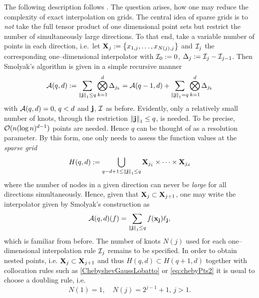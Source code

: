\documentclass[12pt, oneside]{amsart}
\theoremstyle{definition}
\theoremstyle{remark}
\numberwithin{equation}{section}
\begin{document}
The following description follows \cite{BarthelmannHighDim_2000}.
The question arises, how one may reduce the complexity of exact interpolation 
on grids. The central idea of sparse grids is to \emph{not} take the full 
tensor product of one dimensional point sets but restrict the number of 
simultaneously large directions. To that end, take a variable 
number of points in each direction, i.e.\ let \(\XX_j \defn \set{x_{1, j}, 
	\dots, x_{N(j), j}}\) and \(\cI_j\) the corresponding one--dimensional 
interpolator with \(\cI_0 \defn 0\), \(\Delta_j \defn \cI_j - \cI_{j-1}\). 
 Then Smolyak's algorithm is given in a simple recursive 
manner
\begin{equation}\label{Smolyak}
	\cA(q, d) \defn \sum_{\norm[1]{\bfj} \leq q} \bigotimes_{k=1}^d 
	\Delta_{j_k} = \cA(q-1, d)+\sum_{\norm[1]{\bfj}=q} \bigotimes_{k=1}^d 
	\Delta_{j_k}
\end{equation}
with \(\cA(q, d) = 0,\, q < d\) and \(\bfj\), \(\cI\) as before. Evidently, 
only a relatively small number of knots, through the restriction 
\(\norm[1]{\bfj} \leq q\), is needed. To be precise, \(\cO(n (\log n)^{d-1})\) 
points are needed. Hence \(q\)  can be thought of 
as a resolution parameter. By 
this form, one only needs to assess the function values at the \emph{sparse 
grid} \[
H(q, d) \defn \bigcup_{q-d+1 \leq \norm[1]{\bfj} \leq q} \XX_{j_1} \times 
\cdots \times \XX_{j_d}
\]
where the number of nodes in a given direction can never be \emph{large} for 
all directions simultaneously. Hence, given that \(\XX_j \subset \XX_{j+1}\), 
one may write the interpolator given by Smolyak's construction as \[
\cA(q, d)(f) = \sum_{\norm[1]{\bfj} \leq q} f(\bfx_\bfj) \ell_\bfj,
\]
which is familiar from before.
The number of knots \(N(j)\) used for each one--dimensional interpolation rule 
\(\cI_j\) remains to be specified. In order to obtain nested points, i.e. 
\(\XX_j \subset \XX_{j+1}\) and thus \(H(q, d) \subset H(q+1,d)\) together with 
collocation rules such as \cref{ChebyshevGaussLobatto} or \cref{eq:chebyPts2} 
it is usual to choose a doubling rule, i.e. \[
N(1) = 1,\quad N(j) = 2^{j-1}+1,\, j > 1.
\]
\end{document}

